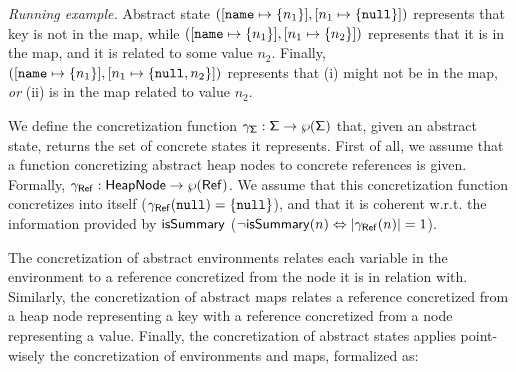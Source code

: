 
\newcommand\runex{\noindent \emph{Running example. }}
\runex
Abstract state $([\mathtt{name} \mapsto \{n_1\}], [n_1 \mapsto \{\mathtt{null}\}])$ represents that key  is not in the map, while $([\mathtt{name} \mapsto \{n_1\}], [n_1 \mapsto \{n_2\}])$ represents that it is in the map, and it is related to some value $n_2$. Finally, $([\mathtt{name} \mapsto \{n_1\}], [n_1 \mapsto \{\mathtt{null}, n_2\}])$ represents that  (i) might not be in the map, \emph{or} (ii) is in the map related to value $n_2$.

%
We define the concretization function $\gamma_{\mathsf{\Sigma}} : \mathsf{\Sigma} \to \wp(\mathsf{\Sigma})$ that, given an abstract state, returns the set of concrete states it represents. First of all, we assume that a function concretizing abstract heap nodes to concrete references is given. Formally, $\gamma_{\mathsf{Ref}} : \mathsf{HeapNode} \to \wp(\mathsf{Ref})$. We assume that this concretization function concretizes  into itself ($\gamma_{\mathsf{Ref}}(\mathtt{null})=\{\mathtt{null}\}$), and that it is coherent w.r.t. the information provided by $\mathsf{isSummary}$ ($\neg \mathsf{isSummary}(n) \Leftrightarrow |\gamma_{\mathsf{Ref}}(n)|=1$).

The concretization of abstract environments relates each variable in the environment to a reference concretized from the node it is in relation with. Similarly, the concretization of abstract maps relates a reference concretized from a heap node representing a key with a reference concretized from a node representing a value. Finally, the concretization of abstract states applies point-wisely the concretization of environments and maps, formalized as:

